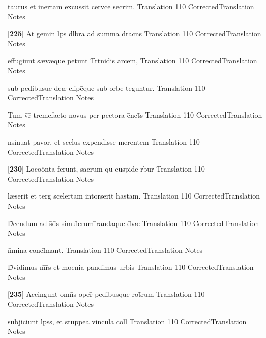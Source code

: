 \latline
  {taurus et inertam excussit cerv\={\macron {\i}}ce sec\={}rim.}
  { Translation }
  {110}
  { CorrectedTranslation }
  { Notes }


\latline
  {[\textbf{225}] At gemin\={\macron {\i}} l\={}ps\={} d\={}l\={}bra ad summa drac\={}n\={}s}
  { Translation }
  {110}
  { CorrectedTranslation }
  { Notes }


\latline
  {effugiunt s{\ae}v{\ae}que petunt Tr\={\macron {\i}}t\={}nidis arcem,}
  { Translation }
  {110}
  { CorrectedTranslation }
  { Notes }


\latline
  {sub pedibusue de{\ae} clipe\={\macron {\i}}que sub orbe teguntur.}
  { Translation }
  {110}
  { CorrectedTranslation }
  { Notes }


\latline
  {Tum v\={}r\={} tremefacto novus per pectora c\={}nct\={\macron {\i}}s}
  { Translation }
  {110}
  { CorrectedTranslation }
  { Notes }


\latline
  {\={\macron {\i}}nsinuat pavor, et scelus expendisse merentem}
  { Translation }
  {110}
  { CorrectedTranslation }
  { Notes }


\latline
  {[\textbf{230}] L\={}oco\"{o}nta ferunt, sacrum qu\={\macron {\i}} cuspide r\={}bur }
  { Translation }
  {110}
  { CorrectedTranslation }
  { Notes }


\latline
  {l{\ae}serit et terg\={} sceler\={}tam intorserit hastam.}
  { Translation }
  {110}
  { CorrectedTranslation }
  { Notes }


\latline
  {D\={}cendum ad s\={}d\={}s simul\={}crum \={}randaque d\={\macron {\i}}v{\ae}}
  { Translation }
  {110}
  { CorrectedTranslation }
  { Notes }


\latline
  {n\={}mina concl\={}mant.}
  { Translation }
  {110}
  { CorrectedTranslation }
  { Notes }


\latline
  {D\={\macron {\i}}vidimus m\={}r\={}s et moenia pandimus urbis}
  { Translation }
  {110}
  { CorrectedTranslation }
  { Notes }


\latline
  {[\textbf{235}] Accingunt omn\={}s oper\={\macron {\i}} pedibusque rot\={}rum}
  { Translation }
  {110}
  { CorrectedTranslation }
  { Notes }


\latline
  {subjiciunt l\={}ps\={}s, et stuppea vincula coll\={}}
  { Translation }
  {110}
  { CorrectedTranslation }
  { Notes }


